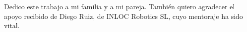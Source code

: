 \documentclass[../main.tex]{subfiles}
\begin{document}
Dedico este trabajo a mi familia y a mi pareja. También quiero agradecer el apoyo recibido de Diego Ruiz, de INLOC Robotics SL, cuyo mentoraje ha sido vital.
\end{document}
